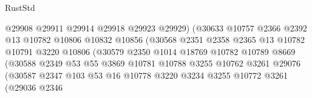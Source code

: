 \begin{lexlean}{RustStd}
\begin{coremodule}
                                      @29908
                                      @29911
                                      @29914
                                      @29918
                                      @29923
                                      @29929)
                                    (@30633
                                      @10757
                                      @2366
                                      @2392
                                      @13
                                      @10782
                                      @10806
                                      @10832
                                      @10856
                                      (@30568
                                        @2351
                                        @2358
                                        @2365
                                        @13
                                        @10782
                                        @10791
                                        @3220
                                        @10806
                                        (@30579
                                          @2350
                                          @1014
                                          @18769
                                          @10782
                                          @10789
                                          @8669
                                          (@30588
                                            @2349
                                            @53
                                            @55
                                            @3869
                                            @10781
                                            @10788
                                            @3255
                                            @10762
                                            @3261
                                            @29076
                                            (@30587
                                              @2347
                                              @103
                                              @53
                                              @16
                                              @10778
                                              @3220
                                              @3234
                                              @3255
                                              @10772
                                              @3261
                                              (@29036
                                                @2346

\end{coremodule}
\end{lexlean}
